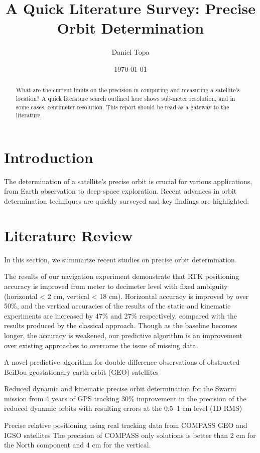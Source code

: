 \documentclass[a4paper,10pt]{article}
\title{A Quick Literature Survey: Precise Orbit Determination}
\author{Daniel Topa}
\date{\today}
\begin{document}
\maketitle

\begin{abstract}
What are the current limits on the precision in computing and measuring a satellite's location? A quick literature search outlined here shows sub-meter resolution, and in some cases, centimeter resolution. This report should be read as a gateway to the literature.
\end{abstract}
\tableofcontents
\section{Introduction}
The determination of a satellite's precise orbit is crucial for various applications, from Earth observation to deep-space exploration. Recent advances in orbit determination techniques are quickly surveyed and key findings are highlighted.

\section{Literature Review}
In this section, we summarize recent studies on precise orbit determination.

The results of our navigation experiment demonstrate
that RTK positioning accuracy is improved from meter to decimeter level with fixed ambiguity (horizontal < 2 cm, vertical < 18 cm).
Horizontal accuracy is improved by over 50\%, and the vertical accuracies of the results of the static and kinematic experiments are
increased by 47\% and 27\% respectively, compared with the results produced by the classical approach. Though as the baseline becomes
longer, the accuracy is weakened, our predictive algorithm is an improvement over existing approaches to overcome the issue of missing
data.


A novel predictive algorithm for double difference observations of obstructed BeiDou geostationary earth orbit (GEO) satellites




Reduced dynamic and kinematic precise orbit determination
for the Swarm mission from 4 years of GPS tracking
30\% improvement in the precision of the reduced dynamic orbits with resulting errors at the 0.5--1 cm level (1D RMS)



Precise relative positioning using real tracking data from COMPASS GEO and IGSO satellites
The precision of COMPASS only solutions is better than 2 cm for the North component and 4 cm for the vertical.
\end{document}
